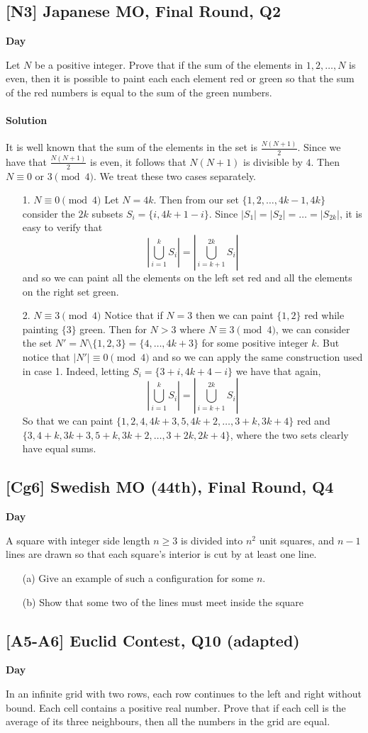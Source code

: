 \documentclass[10pt]{article}
\newcommand{\themonth}{March}
\newcommand{\theyear}{2019}
\newcounter{day}
\newcounter{solution}
\newcounter{datenumber}
\newcommand{\problem}[4][0]{
	\newpage
	\subsection{[#3] \space #2} \hfill 
	{\large\textbf{Day \arabic{day}}} %
	\begin{flushleft} #4 \end{flushleft}
	\vspace{1em}
	\addtocounter{day}{1}
	\addtocounter{datenumber}{1}
	\setcounter{solution}{1}
}
\newcommand{\anonsolution}[2][0]{
	\paragraph{Solution \arabic{solution}} 
	\begin{flushleft} #2 \end{flushleft}
	\addtocounter{solution}{1}
	\vspace{1em}
}
\begin{document}
\problem[21]{2009 Japanese MO, Final Round, Q2}{N3}{Let $N$ be a positive integer. Prove that if the sum of the elements in ${1,2,\dots,N}$ is even, then it is possible to paint each each element red or green so that the sum of the red numbers is equal to the sum of the green numbers.}

\anonsolution[21]{It is well known that the sum of the elements in the set is \(\frac{N(N+1)}{2}\). Since we have that \(\frac{N(N+1)}{2}\) is even, it follows that \(N(N+1)\) is divisible by \(4\). Then  \(N\equiv 0\) or \(3\pmod 4\). We treat these two cases separately. 
	\begin{enumerate}
		\item[1. \(N\equiv 0\pmod 4\)] Let \(N=4k\). Then from our set \(\{1,2,\dots, 4k-1, 4k\}\) consider the \(2k\) subsets \(S_i=\{i,4k+1-i\}. \) Since \(|S_1|=|S_2|=\dots = |S_{2k}|\), it is easy to verify that \[\left|\bigcup_{i=1}^k S_i\right|=\left|\bigcup_{i=k+1}^{2k} S_i\right|\] and so we can paint all the elements on the left set red and all the elements on the right set green.
		\item[2.  \(N\equiv 3 \pmod 4\)] Notice that if \(N=3\) then we can paint \(\{1,2\}\) red while painting \(\{3\}\) green. Then for \(N>3\) where \(N\equiv 3\pmod 4\), we can consider the set \(N'=N\setminus \{1,2,3\}=\{4,\dots, 4k+3\}\) for some positive integer \(k\). But notice that \(|N'|\equiv 0\pmod 4\) and so we can apply the same construction used in case 1. Indeed, letting \(S_i=\{3+i,4k+4-i\}\) we have that again, \[\left|\bigcup_{i=1}^k S_i\right|=\left|\bigcup_{i=k+1}^{2k} S_i\right|\] So that we can paint \(\{1,2,4,4k+3,5,4k+2,\dots, 3+k, 3k+4\}\) red and \(\{3,4+k,3k+3, 5+k, 3k+2,\dots, 3+2k, 2k+4\}\), where the two sets clearly have equal sums.
\end{enumerate}}

\problem[22]{2004 Swedish MO (44th), Final Round, Q4}{Cg6}{A square with integer side length $n \geq 3$ is divided into $n^2$ unit squares, and $n-1$ lines are drawn so that each square's interior is cut by at least one line. \begin{enumerate} \item[(a)] Give an example of such a configuration for some $n$. \item[(b)] Show that some two of the lines must meet inside the square \end{enumerate}}

\problem[23]{2018 Euclid Contest, Q10 (adapted)}{A5-A6}{In an infinite grid with two rows, each row continues to the left and right without bound. Each cell contains a positive real number. Prove that if each cell is the average of its three neighbours, then all the numbers in the grid are equal.}
\end{document}
